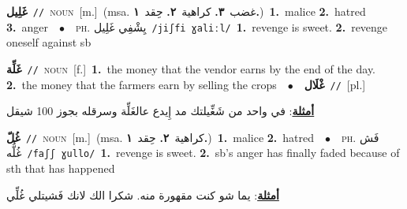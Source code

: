 \documentclass[10pt,a4paper,twoside]{article} %
\begin{document}
\begin{multicols}{2}
{\setlength\topsep{0pt}\textbf{\foreignlanguage{arabic}{غَلِيل}}\ {\color{gray}\texttt{//}\color{black}}\ \textsc{noun}\ [m.]\ \color{gray}(msa. \foreignlanguage{arabic}{غضب}~\foreignlanguage{arabic}{\textbf{٣.}}  \foreignlanguage{arabic}{كراهية}~\foreignlanguage{arabic}{\textbf{٢.}}  \foreignlanguage{arabic}{حِقد}~\foreignlanguage{arabic}{\textbf{١.}})\color{black}\ \textbf{1.}~malice  \textbf{2.}~hatred  \textbf{3.}~anger\ \ $\bullet$\ \ \textsc{ph.} \color{gray} \foreignlanguage{arabic}{يِشْفِي غَلِيل}\color{black}\ {\color{gray}\texttt{/{\sffamily jiʃfi ɣaliːl}/}\color{black}}\ \textbf{1.}~revenge is sweet.  \textbf{2.}~revenge oneself against sb\ } \vspace{2mm}

{\setlength\topsep{0pt}\textbf{\foreignlanguage{arabic}{غَلِّة}}\ {\color{gray}\texttt{//}\color{black}}\ \textsc{noun}\ [f.]\ \textbf{1.}~the money that the vendor earns by the end of the day.  \textbf{2.}~the money that the farmers earn by selling the crops\ \ $\bullet$\ \ \setlength\topsep{0pt}\textbf{\foreignlanguage{arabic}{غْلَال}}\ {\color{gray}\texttt{//}\color{black}}\ [pl.]\  \begin{flushright}\color{gray}\foreignlanguage{arabic}{\textbf{\underline{\foreignlanguage{arabic}{أمثلة}}}: في واحد من شَغِّيلتك مد إِيدع عالغَلِّة وسرقله بجوز 100 شيقل}\end{flushright}\color{black}} \vspace{2mm}

{\setlength\topsep{0pt}\textbf{\foreignlanguage{arabic}{غُلّ}}\ {\color{gray}\texttt{//}\color{black}}\ \textsc{noun}\ [m.]\ \color{gray}(msa. \foreignlanguage{arabic}{كراهية}~\foreignlanguage{arabic}{\textbf{٢.}}  \foreignlanguage{arabic}{حِقد}~\foreignlanguage{arabic}{\textbf{١.}})\color{black}\ \textbf{1.}~malice  \textbf{2.}~hatred\ \ $\bullet$\ \ \textsc{ph.} \color{gray} \foreignlanguage{arabic}{فَش غُلُّه}\color{black}\ {\color{gray}\texttt{/{\sffamily faʃʃ ɣullo}/}\color{black}}\ \textbf{1.}~revenge is sweet.  \textbf{2.}~sb's anger has finally faded because of sth that has happened\  \begin{flushright}\color{gray}\foreignlanguage{arabic}{\textbf{\underline{\foreignlanguage{arabic}{أمثلة}}}: يما شو كنت مقهورة منه. شكرا الك لانك فَشيتلي غُلِّي}\end{flushright}\color{black}} \vspace{2mm}


\end{multicols}
\end{document}

